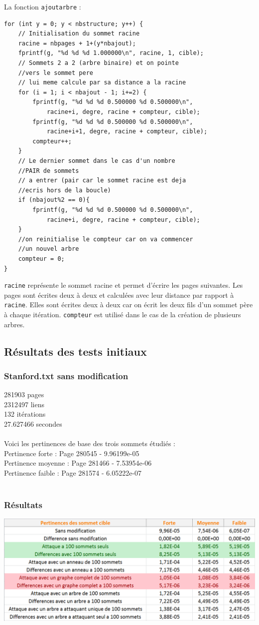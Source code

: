 \documentclass[a4paper,11pt]{article}
\begin{document}
	La fonction \texttt{ajoutarbre} :
	\begin{lstlisting}
for (int y = 0; y < nbstructure; y++) {
	// Initialisation du sommet racine
	racine = nbpages + 1+(y*nbajout);
	fprintf(g, "%d %d %d 1.000000\n", racine, 1, cible);
	// Sommets 2 a 2 (arbre binaire) et on pointe 
	//vers le sommet pere 
	// lui meme calcule par sa distance a la racine	
	for (i = 1; i < nbajout - 1; i+=2) {
		fprintf(g, "%d %d %d 0.500000 %d 0.500000\n", 
			racine+i, degre, racine + compteur, cible);	
		fprintf(g, "%d %d %d 0.500000 %d 0.500000\n", 
			racine+i+1, degre, racine + compteur, cible);	
		compteur++;
	}
	// Le dernier sommet dans le cas d'un nombre 
	//PAIR de sommets 
	// a entrer (pair car le sommet racine est deja 
	//ecris hors de la boucle)
	if (nbajout%2 == 0){ 
		fprintf(g, "%d %d %d 0.500000 %d 0.500000\n", 
			racine+i, degre, racine + compteur, cible);
	}
	//on reinitialise le compteur car on va commencer
	//un nouvel arbre
	compteur = 0;
}
	\end{lstlisting}
	\texttt{racine} représente le sommet racine et permet d'écrire les pages suivantes. Les pages sont écrites deux à deux et calculées avec leur distance par rapport à \texttt{racine}. Elles sont écrites deux à deux car on écrit les deux fils d'un sommet père à chaque itération. \texttt{compteur} est utilisé dans le cas de la création de plusieurs arbres.

	\subsection{Résultats des tests initiaux}
		\subsubsection{Stanford.txt sans modification}
			281903 pages\\
			2312497 liens\\
			132 itérations\\
			27.627466 secondes\\
			\\
			Voici les pertinences de base des trois sommets étudiés :\\
			Pertinence forte : Page 280545 - 9.96199e-05\\
			Pertinence moyenne : Page 281466 - 7.53954e-06\\
			Pertinence faible : Page 281574 - 6.05222e-07\\
			\\
		\subsubsection{Résultats}
			\includegraphics[scale = 0.5]{Captures/ranking1.PNG}
\end{document}
